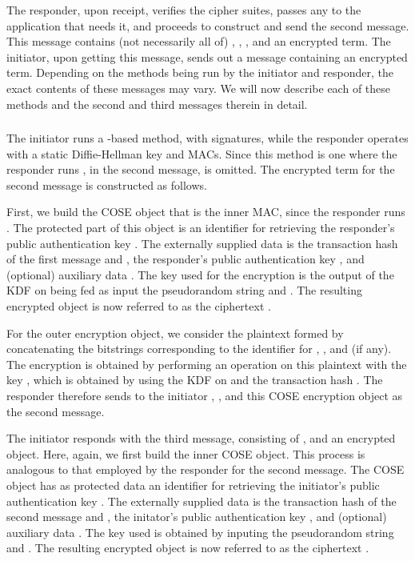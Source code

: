 The responder, upon receipt, verifies the cipher suites, passes any \mADone to the application that needs it, and proceeds to construct and send the second message. This message contains (not necessarily all of) \mCi, \mGy, \mCr, and an encrypted term. The initiator, upon getting this message, sends out a message containing an encrypted term. Depending on the methods being run by the initiator and responder, the exact contents of these messages may vary. We will now describe each of these methods and the second and third messages therein in detail.

\subsubsection{\mSigStat}
The initiator runs a \mSigma-based method, with signatures, while the responder operates with a static Diffie-Hellman key and MACs. Since this method is one where the responder runs \mStat, in the second message, \mCi is omitted. The encrypted term for the second message is constructed as follows. 

First, we build the COSE object that is the inner MAC, since the responder runs \mStat. The protected part of this object is an identifier for retrieving the responder's public authentication key \mCredr. The externally supplied data is the transaction hash \mTHtwo of the first message and \mGy,  the responder's public authentication key \mCredr, and (optional) auxiliary data \mADtwo. The key used for the encryption is the output of the KDF on being fed as input the pseudorandom string \mPRKthree and \mTHtwo. The resulting encrypted object is now referred to as the ciphertext \mMactwo. 

For the outer encryption object, we consider the plaintext formed by concatenating the bitstrings corresponding to the identifier for \mCredr, \mMactwo, and \mADtwo (if any). The encryption is obtained by performing an \mXor operation on this plaintext with the key \mKtwo, which is obtained by using the KDF on \mPRKtwo and the transaction hash \mTHtwo. The responder therefore sends to the initiator \mGy, \mCr, and this COSE encryption object as the second message.

The initiator responds with the third message, consisting of \mCr, and an encrypted object. Here, again, we first build the inner COSE object. This process is analogous to that employed by the responder for the second message. The COSE object has as protected data an identifier for retrieving the initiator's public authentication key \mCredi. The externally supplied data is the transaction hash \mTHthree of the second message and \mTHtwo,  the initator's public authentication key \mCredi, and (optional) auxiliary data \mADthree. The key used is obtained by inputing the pseudorandom string \mPRKfour and \mTHthree. The resulting encrypted object is now referred to as the ciphertext \mMacthree. 

